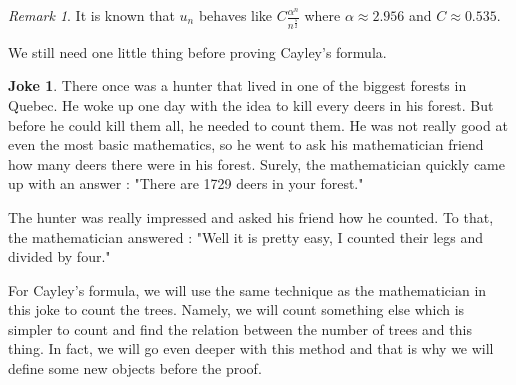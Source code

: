 \documentclass{tufte-handout}
\theoremstyle{definition}
\newtheorem{jk}[thm]{Joke}
\theoremstyle{remark}
\newtheorem{rem}[thm]{Remark}
\begin{document}
\begin{rem}
	It is known that $u_n$ behaves like $C\frac{\alpha^n}{n^{\frac{5}{2}}}$ where $\alpha \approx 2.956$ and $C \approx 0.535$.
\end{rem}

We still need one little thing before proving Cayley's formula.
\begin{jk}
	There once was a hunter that lived in one of the biggest forests in Quebec. He woke up one day with the idea to kill every deers in his forest. But before he could kill them all, he needed to count them. He was not really good at even the most basic mathematics, so he went to ask his mathematician friend how many deers there were in his forest. Surely, the mathematician quickly came up with an answer : "There are 1729 deers in your forest."
	
	The hunter was really impressed and asked his friend how he counted. To that, the mathematician answered : "Well it is pretty easy, I counted their legs and divided by four."
\end{jk}

For Cayley's formula, we will use the same technique as the mathematician in this joke to count the trees. Namely, we will count something else which is simpler to count and find the relation between the number of trees and this thing. In fact, we will go even deeper with this method and that is why we will define some new objects before the proof.
\end{document}
